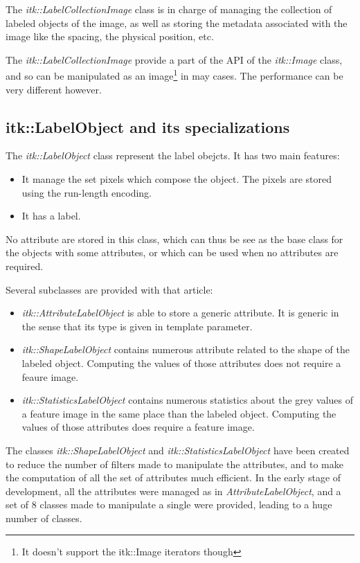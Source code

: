 \documentclass{InsightArticle}
\begin{document}
The {\em itk::LabelCollectionImage} class is in charge of managing the
collection of labeled
objects of the image, as well as storing the metadata associated with the image
like
the spacing, the physical position, etc.

The {\em itk::LabelCollectionImage} provide a part of the API of the {\em
itk::Image} class,
and so can be manipulated as an image\footnote{It doesn't support the itk::Image
iterators though}
in may cases. The performance can be very different however.

\subsection{itk::LabelObject and its specializations}

The {\em itk::LabelObject} class represent the label obejcts. It has two main
features:
\begin{itemize}
  \item It manage the set pixels which compose the object. The pixels are stored
using the run-length encoding.
  \item It has a label.
\end{itemize}

No attribute are stored in this class, which can thus be see as the base class
for the objects with some attributes, or which can be used when no attributes
are required.

Several subclasses are provided with that article:
\begin{itemize}
  \item {\em itk::AttributeLabelObject} is able to store a generic attribute. It
is generic in the sense that its type is given in template parameter.
  \item {\em itk::ShapeLabelObject} contains numerous attribute related to the
shape of the labeled object. Computing the values of those attributes does not
require a feaure image.
  \item {\em itk::StatisticsLabelObject} contains numerous statistics about the
grey values of a feature image in the same place than the labeled object.
Computing the values of those attributes does require a feature image.
\end{itemize}

The classes {\em itk::ShapeLabelObject} and {\em itk::StatisticsLabelObject} have been
created to reduce the number of filters made to manipulate the attributes, and to make
the computation of all the set of attributes much efficient. In the early stage of
development, all the attributes were managed as in {\em AttributeLabelObject}, and
a set of 8 classes made to manipulate a single were provided, leading to a huge
number of classes.
\end{document}
